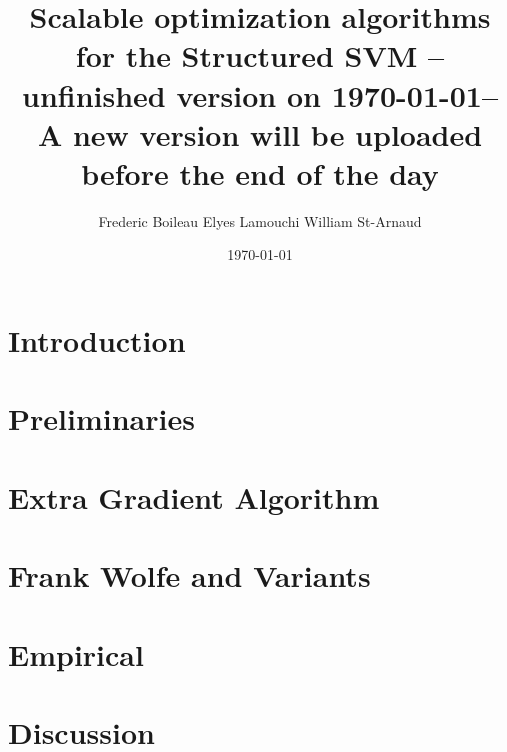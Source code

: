 

\usepackage[
  backend=biber,
  citestyle=authoryear-ibid,
  natbib=true
  ]{biblatex}
\usepackage{csquotes}
\usepackage{comment}
\usepackage{fancyhdr}
\pagestyle{fancyplain}
\fancyhf{}
\rhead{ \fancyplain{}{\today} }
\rfoot{ \fancyplain{}{\thepage} }

\renewcommand\nameyeardelim{, }



\usepackage[toc,page]{appendix}

\title{Scalable optimization algorithms for the Structured SVM -- unfinished
  version on \today  -- A new version will be uploaded before the end of the day}
\date{\today}
\author{Frederic Boileau Elyes Lamouchi William St-Arnaud}

\maketitle

\tableofcontents
\clearpage
\section{Introduction}


\clearpage
\section{Preliminaries}

% 

\clearpage
\section{Extra Gradient Algorithm}


\clearpage
\section{Frank Wolfe and Variants}


\clearpage
\section{Empirical}


\clearpage
\section{Discussion}


